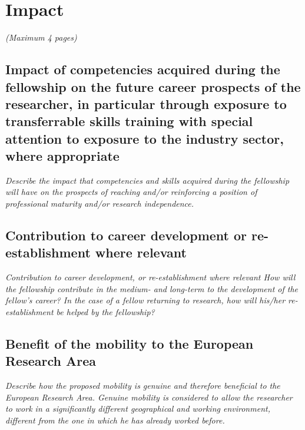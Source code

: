 \documentclass[a4paper,11pt]{article}
\newenvironment{xcomment}{\em}{}
\begin{document}


\newpage
\section{Impact}
\begin{xcomment}  
(Maximum 4 pages)
\end{xcomment}
\subsection{Impact of competencies acquired during the fellowship on the future career prospects of the researcher, in particular through exposure to transferrable skills training with special attention to exposure to the industry sector, where appropriate}
\begin{xcomment}
 Describe the impact that competencies and skills acquired during the fellowship will have on the
prospects of reaching and/or reinforcing a position of professional maturity and/or research
independence.
\end{xcomment}

\subsection{Contribution to career development or re-establishment where relevant}
\begin{xcomment}
 Contribution to career development, or re-establishment where relevant
How will the fellowship contribute in the medium- and long-term to the development of the
fellow’s career? In the case of a fellow returning to research, how will his/her re-establishment be
helped by the fellowship?
\end{xcomment}

\subsection{Benefit of the mobility to the European Research Area}
\begin{xcomment}
 Describe how the proposed mobility is genuine and therefore beneficial to the European
Research Area. Genuine mobility is considered to allow the researcher to work in a significantly
different geographical and working environment, different from the one in which he has already
worked before.
\end{xcomment}
\end{document}
